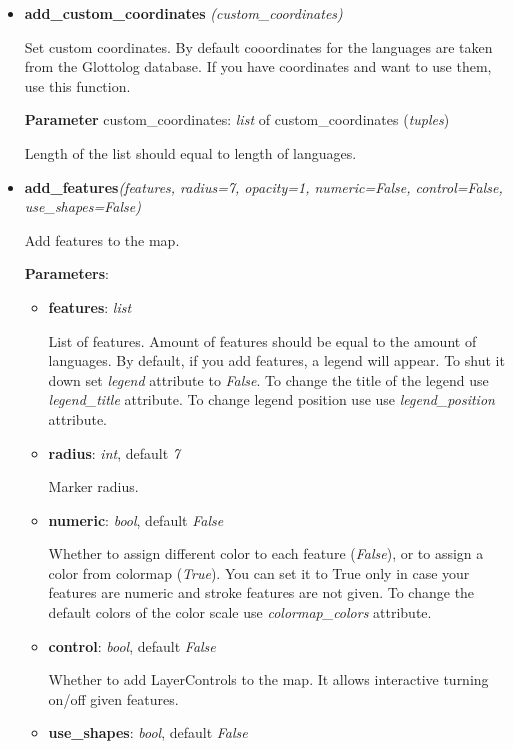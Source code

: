 \documentclass[a4paper,12pt]{article}
\begin{document}
\begin{itemize}

 \item \textbf{add\_custom\_coordinates} \textit{(custom\_coordinates)}

 Set custom coordinates. By default cooordinates for the languages are taken from the Glottolog database. If you have coordinates and want to use them, use this function.
        
 \textbf{Parameter} custom\_coordinates: \textit{list} of custom\_coordinates (\textit{tuples})
 
 Length of the list should equal to length of languages.

 \item \textbf{add\_features}\textit{(features, radius=7, opacity=1, numeric=False, control=False, use\_shapes=False)}
 
 Add features to the map.
 
 \textbf{Parameters}:
 \begin{itemize}
 \item \textbf{features}: \textit{list}
 
 List of features. Amount of features should be equal to the amount of languages.
 By default, if you add features, a legend will appear. To shut it down set \textit{legend} attribute to \textit{False}.
 To change the title of the legend use \textit{legend_title} attribute.
 To change legend position use use \textit{legend\_position} attribute.
 
 \item \textbf{radius}: \textit{int}, default \textit{7}
 
 Marker radius.
 
 \item \textbf{numeric}: \textit{bool}, default \textit{False}
  
  Whether to assign different color to each feature (\textit{False}), or to assign a color from colormap (\textit{True}).
  You can set it to True only in case your features are numeric and stroke features are not given.
  To change the default colors of the color scale use \textit{colormap\_colors} attribute.
  
  \item \textbf{control}: \textit{bool}, default \textit{False}

  Whether to add LayerControls to the map.
  It allows interactive turning on/off given features.

  \item \textbf{use\_shapes}: \textit{bool}, default \textit{False}


\end{itemize}
\end{itemize}
\end{document}
